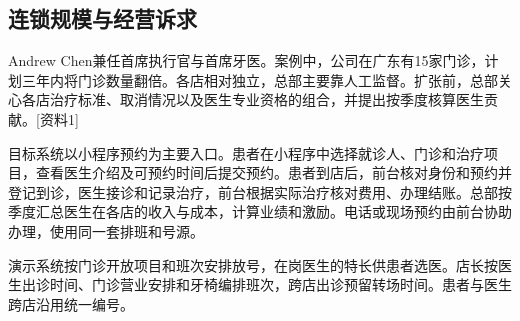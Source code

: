 \documentclass[UTF8,12pt,a4paper,fontset=none]{ctexart}
\begin{document}
\subsection{连锁规模与经营诉求}
Andrew Chen兼任首席执行官与首席牙医。案例中，公司在广东有15家门诊，计划三年内将门诊数量翻倍。各店相对独立，总部主要靠人工监督。扩张前，总部关心各店治疗标准、取消情况以及医生专业资格的组合，并提出按季度核算医生贡献。[资料1]\par
目标系统以小程序预约为主要入口。患者在小程序中选择就诊人、门诊和治疗项目，查看医生介绍及可预约时间后提交预约。患者到店后，前台核对身份和预约并登记到诊，医生接诊和记录治疗，前台根据实际治疗核对费用、办理结账。总部按季度汇总医生在各店的收入与成本，计算业绩和激励。电话或现场预约由前台协助办理，使用同一套排班和号源。\par
演示系统按门诊开放项目和班次安排放号，在岗医生的特长供患者选医。店长按医生出诊时间、门诊营业安排和牙椅编排班次，跨店出诊预留转场时间。患者与医生跨店沿用统一编号。\par
\Needspace{522pt}
\end{document}
